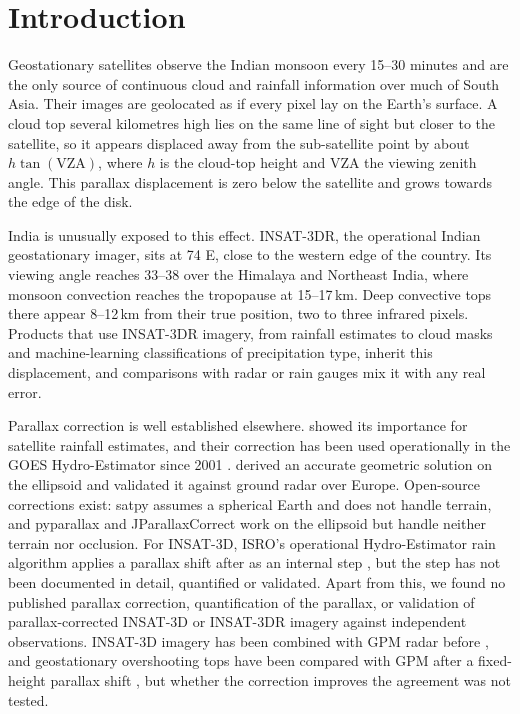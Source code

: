 \section{Introduction}
\label{sec:introduction}

Geostationary satellites observe the Indian monsoon every 15--30 minutes and are the only source of continuous cloud and rainfall information over much of South Asia. Their images are geolocated as if every pixel lay on the Earth's surface. A cloud top several kilometres high lies on the same line of sight but closer to the satellite, so it appears displaced away from the sub-satellite point by about $h\tan(\mathrm{VZA})$, where $h$ is the cloud-top height and VZA the viewing zenith angle. This parallax displacement is zero below the satellite and grows towards the edge of the disk.

India is unusually exposed to this effect. INSAT-3DR, the operational Indian geostationary imager, sits at 74\,\textdegree\,E, close to the western edge of the country. Its viewing angle reaches 33--38\textdegree{} over the Himalaya and Northeast India, where monsoon convection reaches the tropopause at 15--17\,km. Deep convective tops there appear 8--12\,km from their true position, two to three infrared pixels. Products that use INSAT-3DR imagery, from rainfall estimates to cloud masks and machine-learning classifications of precipitation type, inherit this displacement, and comparisons with radar or rain gauges mix it with any real error.

Parallax correction is well established elsewhere. \citet{vicente2002} showed its importance for satellite rainfall estimates, and their correction has been used operationally in the GOES Hydro-Estimator since 2001 \citep{scofield2003}. \citet{bielinski2020} derived an accurate geometric solution on the ellipsoid and validated it against ground radar over Europe. Open-source corrections exist: satpy \citep{raspaud2018,satpy_parallax} assumes a spherical Earth and does not handle terrain, and pyparallax \citep{pyparallax} and JParallaxCorrect \citep{tsujino2026} work on the ellipsoid but handle neither terrain nor occlusion. For INSAT-3D, ISRO's operational Hydro-Estimator rain algorithm applies a parallax shift after \citet{vicente2002} as an internal step \citep{sac2015atbd,malhan2022}, but the step has not been documented in detail, quantified or validated. Apart from this, we found no published parallax correction, quantification of the parallax, or validation of parallax-corrected INSAT-3D or INSAT-3DR imagery against independent observations. INSAT-3D imagery has been combined with GPM radar before \citep{mishra2023}, and geostationary overshooting tops have been compared with GPM after a fixed-height parallax shift \citep{sun2024}, but whether the correction improves the agreement was not tested.

